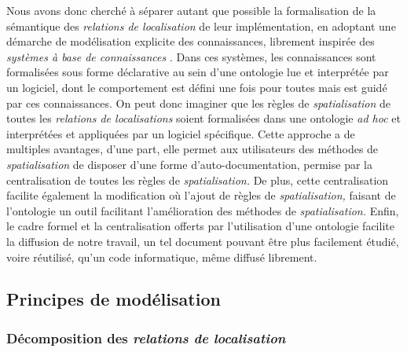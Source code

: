 Nous avons donc cherché à séparer autant que possible la formalisation
de la sémantique des \emph{relations de localisation} de leur
implémentation, en adoptant une démarche de modélisation explicite des
connaissances, librement inspirée des \emph{systèmes à base de
  connaissances} \autocite{LeBer2006}. Dans ces systèmes, les
connaissances sont formalisées sous forme déclarative au sein d'une
ontologie lue et interprétée par un logiciel, dont le comportement est
défini une fois pour toutes mais est guidé par ces connaissances. On
peut donc imaginer que les règles de \emph{spatialisation} de toutes
les \emph{relations de localisations} soient formalisées dans une
ontologie \emph{ad hoc} et interprétées et appliquées par un logiciel
spécifique. Cette approche a de multiples avantages, d'une part, elle
permet aux utilisateurs des méthodes de \emph{spatialisation} de
disposer d'une forme d'auto-documentation, permise par la
centralisation de toutes les règles de \emph{spatialisation.} De plus,
cette centralisation facilite également la modification où l'ajout de
règles de \emph{spatialisation,} faisant de l'ontologie un outil
facilitant l'amélioration des méthodes de \emph{spatialisation.}
Enfin, le cadre formel et la centralisation offerts par l’utilisation
d'une ontologie facilite la diffusion de notre travail, un tel
document pouvant être plus facilement étudié, voire réutilisé, qu'un
code informatique, même diffusé librement.

\subsection{Principes de modélisation}

\subsubsection{Décomposition des \emph{relations de localisation}}
\label{subsec:4-1-2-1}

